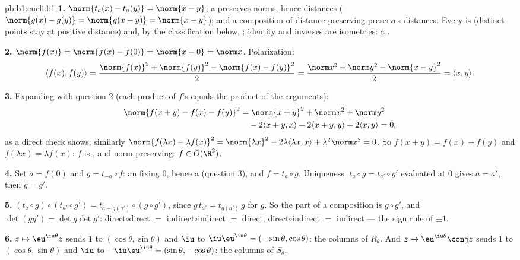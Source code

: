 \begin{solution}{pb:b1:euclid:1}
\textbf{1.} $\norm{t_a(x) - t_a(y)} = \norm{x - y}$; a 
 preserves norms, hence distances ($\norm{g(x) - g(y)} =
\norm{g(x - y)} = \norm{x-y}$); and a composition of
distance-preserving  preserves distances. Every  is
 (distinct points stay at positive distance) and, by
the classification below, ; identity and inverses are
isometries: a .

\textbf{2.} $\norm{f(x)} = \norm{f(x) - f(0)} = \norm{x - 0} =
\norm x$. Polarization:
\[
\langle f(x), f(y)\rangle
= \frac{\norm{f(x)}^2 + \norm{f(y)}^2 - \norm{f(x) -
f(y)}^2}{2}
= \frac{\norm x^2 + \norm y^2 - \norm{x - y}^2}{2}
= \langle x, y\rangle .
\]

\textbf{3.} Expanding with question 2 (each product of $f$'s
equals the product of the arguments):
\begin{align*}
\norm{f(x+y) - f(x) - f(y)}^2
&= \norm{x+y}^2 + \norm x^2 + \norm y^2\\
&\quad - 2\langle x+y, x\rangle - 2\langle x+y, y\rangle
+ 2\langle x, y\rangle = 0 ,
\end{align*}
as a direct check shows; similarly $\norm{f(\lambda x) -
\lambda f(x)}^2 = \norm{\lambda x}^2 - 2\lambda\langle \lambda
x, x\rangle + \lambda^2\norm x^2 = 0$. So $f(x + y) = f(x) +
f(y)$ and $f(\lambda x) = \lambda f(x)$: $f$ is , and
norm-preserving: $f \in O(\R^2)$.

\textbf{4.} Set $a = f(0)$ and $g = t_{-a}\circ f$: an 
fixing $0$, hence a   (question 3), and $f = t_a
\circ g$. Uniqueness: $t_a \circ g = t_{a'}\circ g'$ evaluated
at $0$ gives $a = a'$, then $g = g'$.

\textbf{5.} $(t_a\circ g)\circ(t_{a'}\circ g') = t_{a +
g(a')}\circ(g\circ g')$, since $g\,t_{a'} = t_{g(a')}\,g$ for
 $g$. So the  part of a composition is $g \circ g'$,
and $\det(gg') = \det g \det g'$: direct$\circ$direct $=$
indirect$\circ$indirect $=$ direct,
direct$\circ$indirect $=$ indirect --- the sign rule of $\pm1$.

\textbf{6.} $z \mapsto \eu^{\iu\theta}z$ sends $1$ to
$(\cos\theta, \sin\theta)$ and $\iu$ to
$\iu\eu^{\iu\theta} = (-\sin\theta, \cos\theta)$: the columns of
$R_\theta$. And $z \mapsto \eu^{\iu\theta}\conj z$ sends $1$ to
$(\cos\theta, \sin\theta)$ and $\iu$ to $-\iu\eu^{\iu\theta} =
(\sin\theta, -\cos\theta)$: the columns of $S_\theta$.


\end{solution}
